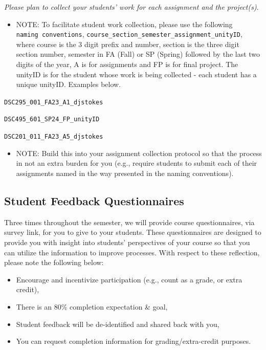 \documentclass[
]{book}
\providecommand{\tightlist}{%
  \setlength{\itemsep}{0pt}\setlength{\parskip}{0pt}}
\begin{document}
{ \emph{Please plan to collect your students' work for each assignment and the project(s)}. }

\begin{itemize}
\tightlist
\item
  NOTE: To facilitate student work collection, please use the following \texttt{naming\ conventions}, \texttt{course\_section\_semester\_assignment\_unityID}, where course is the 3 digit prefix and number, section is the three digit section number, semester in FA (Fall) or SP (Spring) followed by the last two digits of the year, A is for assignments and FP is for final project. The unityID is for the student whose work is being collected - each student has a unique unityID. Examples below.
\end{itemize}

\texttt{DSC295\_001\_FA23\_A1\_djstokes}

\texttt{DSC495\_601\_SP24\_FP\_unityID}

\texttt{DSC201\_011\_FA23\_A5\_djstokes}

\begin{itemize}
\tightlist
\item
  NOTE: Build this into your assignment collection protocol so that the process in not an extra burden for you (e.g., require students to submit each of their assignments named in the way presented in the naming conventions).
\end{itemize}

\hypertarget{student-feedback-questionnaires}{%
\subsection{Student Feedback Questionnaires}\label{student-feedback-questionnaires}}

Three times throughout the semester, we will provide course questionnaires, via survey link, for you to give to your students. These questionnaires are designed to provide you with insight into students' perspectives of your course so that you can utilize the information to improve processes. With respect to these reflection, please note the following below:

\begin{itemize}
\tightlist
\item
  Encourage and incentivize participation (e.g., count as a grade, or extra credit),
\item
  There is an 80\% completion expectation \& goal,
\item
  Student feedback will be de-identified and shared back with you,
\item
  You can request completion information for grading/extra-credit purposes.
\end{itemize}
\end{document}
